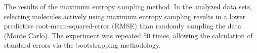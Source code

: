 The results of the maximum entropy sampling method.  In the analyzed data sets, selecting molecules actively using maximum entropy sampling results in a lower predictive root-mean-squared-error (RMSE) than randomly sampling the data (Monte Carlo). The experiment was repeated 50 times, allowing the calculation of standard errors via the bootstrapping methodology.\label{fig:max_entropy}
